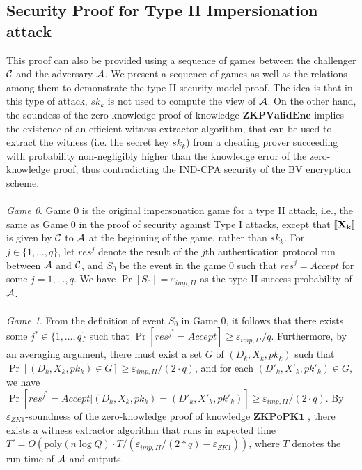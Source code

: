 \subsection{Security Proof for Type II Impersionation attack}
\label{append:ProofsTypeII}
This proof can also be provided using a sequence of games between the challenger
$\mathcal{C}$ and the adversary $\mathcal{A}$. We present
a sequence of games as well as the relations among them to demonstrate the type II security model proof. The idea is that in this type of attack, $sk_k$ is not used to compute the view of $\mathcal{A}$. On the other hand, the soundess of the zero-knowledge proof of knowledge $\mathbf{ZKPValidEnc}$ implies the existence of an efficient witness extractor algorithm, that can be used to extract the witness (i.e. the secret key $sk_k$) from a cheating prover succeeding with probability non-negligibly higher than the knowledge error of the zero-knowledge proof, thus contradicting the IND-CPA security of the BV encryption scheme. \\\\
\textit{Game 0}. Game 0 is the original impersonation game for a type II attack,
i.e., the same as Game 0 in the proof of security against Type I attacks, except
that $\left\llbracket\mathbf{X_{k}}\right\rrbracket$ is given by $\mathcal{C}$ to $\mathcal{A}$ at the
beginning of the game, rather than $sk_k$.  For $j \in \{1,\ldots,q\}$, let
$res^{j}$ denote the result of the $j$th authentication protocol run between
$\mathcal{A}$ and $\mathcal{C}$, and $S_0$ be
the event in the game $0$ such that $res^{j} = Accept$ for some $j=1,\ldots,q$. We have $\Pr[S_0] = \varepsilon_{imp,II}$ as the type II success probability of $\mathcal{A}$. \\\\
\textit{Game 1}. From the definition of event $S_0$ in Game 0, it follows that
there exists some $j^* \in \{1,\ldots,q\}$ such that
$\Pr[res^{j^*} = Accept] \geq \varepsilon_{imp,II}/q$. Furthermore, by an
averaging argument, there must exist a set $G$ of $(D_k,X_k,pk_k)$ such that
$\Pr[(D_k,X_k,pk_k) \in G] \geq \varepsilon_{imp,II}/(2 \cdot q)$, and for each
$(D'_k,X'_k,pk'_k) \in G$, we have
$\Pr[res^{j^*} = Accept |(D_k,X_k,pk_k)=(D'_k,X'_k,pk'_k)] \geq
\varepsilon_{imp,II}/(2 \cdot q)$. By $\varepsilon_{ZK1}$-soundness of the
zero-knowledge proof of knowledge $\mathbf{ZKPoPK1}$
\cite{goldreich2009foundations}, there exists a witness extractor algorithm that
runs in expected time
$T'=O(\mathrm{poly}(n \log Q) \cdot T / (\varepsilon_{imp,II}/(2*q) -
\varepsilon_{ZK1}))$, where $T$ denotes the run-time of $\mathcal{A}$ and outputs
